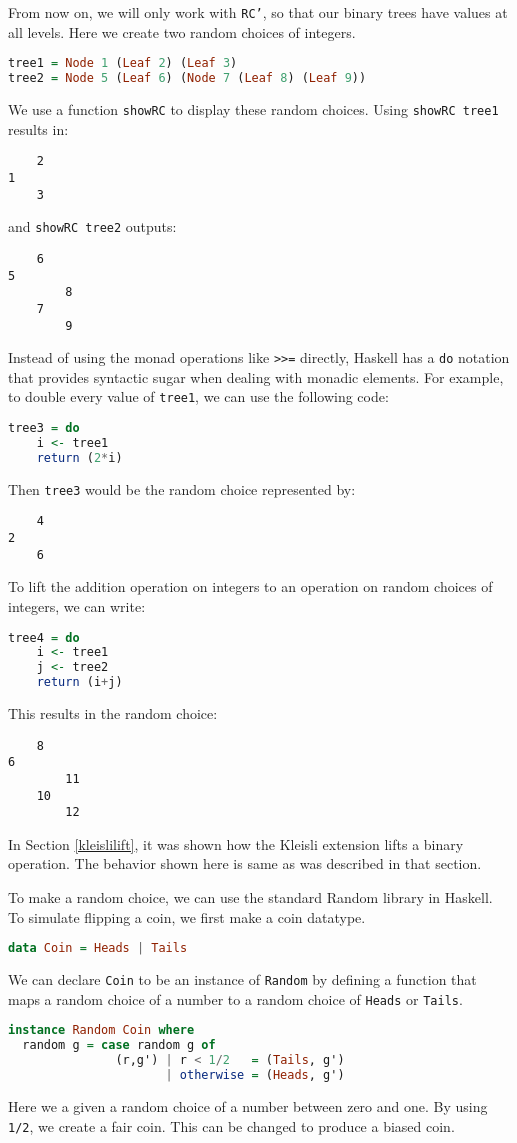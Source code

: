 From now on, we will only work with \texttt{RC'}, so that our binary trees have values at all levels.
Here we create two random choices of integers.
\begin{lstlisting}[language=Haskell]
tree1 = Node 1 (Leaf 2) (Leaf 3)
tree2 = Node 5 (Leaf 6) (Node 7 (Leaf 8) (Leaf 9))
\end{lstlisting}
We use a function \texttt{showRC} to display these random choices.  Using \texttt{showRC tree1} results in:
\begin{verbatim}
    2
1
    3
\end{verbatim}
and \texttt{showRC tree2} outputs:
\begin{verbatim}
    6
5
        8
    7
        9
\end{verbatim}
Instead of using the monad operations like \texttt{>>=} directly, Haskell has a \texttt{do} notation that provides syntactic sugar when dealing with monadic elements.  For example, to double every value of \texttt{tree1}, we can use the following code:
\begin{lstlisting}[language=Haskell]
tree3 = do
	i <- tree1
	return (2*i)
\end{lstlisting}
Then \texttt{tree3} would be the random choice represented by:
\begin{verbatim}
    4
2
    6
\end{verbatim}
To lift the addition operation on integers to an operation on random choices of integers, we can write:
\begin{lstlisting}[language=Haskell]
tree4 = do
	i <- tree1
	j <- tree2
	return (i+j)
\end{lstlisting}
This results in the random choice:
\begin{verbatim}
    8
6
        11
    10
        12
\end{verbatim}
In Section \ref{kleislilift}, it was shown how the Kleisli extension lifts a binary operation.  The behavior shown here is same as was described in that section.

To make a random choice, we can use the standard Random library in Haskell.  To simulate flipping a coin, we first make a coin datatype.
\begin{lstlisting}[language=Haskell]
data Coin = Heads | Tails
\end{lstlisting}
We can declare \texttt{Coin} to be an instance of \texttt{Random} by defining a function that maps a random choice of a number to a random choice of \texttt{Heads} or \texttt{Tails}.
\begin{lstlisting}[language=Haskell]
instance Random Coin where
  random g = case random g of 
               (r,g') | r < 1/2   = (Tails, g')
                      | otherwise = (Heads, g')
\end{lstlisting}
Here we a given a random choice of a number between zero and one.  By using \texttt{1/2}, we create a fair coin.  This can be changed to produce a biased coin.

